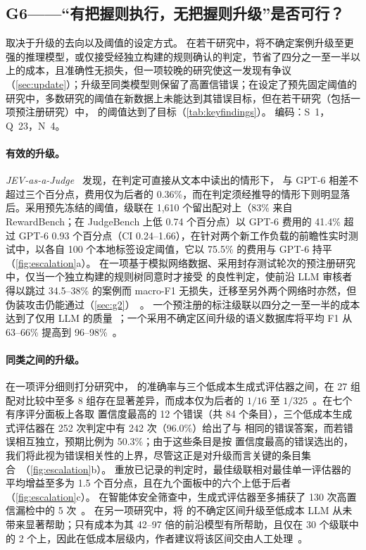 \subsection{G6——“有把握则执行，无把握则升级”是否可行？}
\label{sec:g6}

\begin{answerbox}
取决于升级的去向以及阈值的设定方式。
在若干研究中，将不确定案例升级至更强的推理模型，或仅接受经独立构建的规则确认的判定，节省了四分之一至一半以上的成本，且准确性无损失，但一项较晚的研究使这一发现有争议（\cref{sec:update}）；升级至同类模型则保留了高置信错误；在设定了预先固定阈值的研究中，多数研究的阈值在新数据上未能达到其错误目标，但在若干研究（包括一项预注册研究）中，\jev{} 的阈值达到了目标（\cref{tab:keyfindings}）。
编码：S~1，Q~23，N~4。
\end{answerbox}

\paragraph{有效的升级。}
\emph{JEV-as-a-Judge}~\cite{arx26550} 发现，在判定可直接从文本中读出的情形下，\jev{} 与 GPT-6 相差不超过三个百分点，费用仅为后者的 0.36\%，而在判定须经推导的情形下则明显落后。采用预先冻结的阈值，级联在 1{,}610 个留出配对上（83\% 来自 RewardBench；在 JudgeBench 上低 0.74 个百分点）以 GPT-6 费用的 41.4\% 超过 GPT-6 0.93 个百分点（CI 0.24--1.66），在针对两个新工作负载的前瞻性实时测试中，以各自 100 个本地标签设定阈值，它以 75.5\% 的费用与 GPT-6 持平（\cref{fig:escalation}a）。
在一项基于模拟网络数据、采用封存测试轮次的预注册研究中，仅当一个独立构建的规则树同意时才接受 \jev{} 的良性判定，使前沿 LLM 审核者得以跳过 34.5--38\% 的案例而 macro-F1 无损失，迁移至另外两个网络时亦然，但伪装攻击仍能通过（\cref{sec:g2}）~\cite{arx02048}。
一个预注册的标注级联以四分之一至一半的成本达到了仅用 LLM 的质量~\cite{arx24574}；一个采用不确定区间升级的语义数据库将平均 F1 从 63--66\% 提高到 96--98\%~\cite{arx02046}。

\paragraph{同类之间的升级。}
在一项评分细则打分研究中，\jev{} 的准确率与三个低成本生成式评估器之间，在 27 组配对比较中至多 8 组存在显著差异，而成本仅为后者的 $1/16$ 至 $1/325$~\cite{arx29769}。在七个有序评分面板上各取 \jev{} 置信度最高的 12 个错误（共 84 个条目），三个低成本生成式评估器在 252 次判定中有 242 次（96.0\%）给出了与 \jev{} 相同的错误答案，而若错误相互独立，预期比例为 50.3\%；由于这些条目是按 \jev{} 置信度最高的错误选出的，我们将此视为错误相关性的上界，尽管这正是对升级而言关键的条目集合~\cite{arx29769}（\cref{fig:escalation}b）。
重放已记录的判定时，最佳级联相对最佳单一评估器的平均增益至多为 1.5 个百分点，且在九个面板中的六个上低于后者（\cref{fig:escalation}c）。
在智能体安全筛查中，生成式评估器至多捕获了 \jev{} 130 次高置信漏检中的 5 次~\cite{arx33401}。
在另一项研究中，将 \jev{} 的不确定区间升级至低成本 LLM 从未带来显著帮助；只有成本为其 42--97 倍的前沿模型有所帮助，且仅在 30 个级联中的 2 个上，因此在低成本层级内，作者建议将该区间交由人工处理~\cite{zen22885291}\zmark{}。


